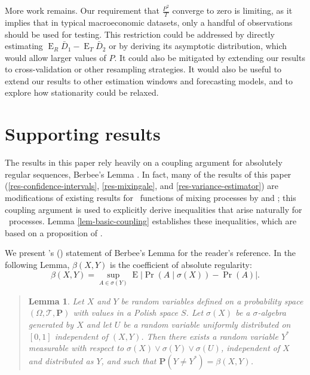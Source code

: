 \documentclass[11pt]{article}
\newtheorem{lem}[thm]{Lemma}
\DeclareMathOperator{\E}{E}
\begin{document}
More work remains.  Our requirement that $\frac{P^2}{T}$ converge to
zero is limiting, as it implies that in typical macroeconomic
datasets, only a handful of observations should be used for testing.
This restriction could be addressed by directly estimating $\E_R \bar
D_1 - \E_T \bar{D}_2$ or by deriving its asymptotic distribution,
which would allow larger values of $P$.  It could also be mitigated by
extending our results to cross-validation or other resampling
strategies.  It would also be useful to extend our results to other
estimation windows and forecasting models, and to explore how
stationarity could be relaxed.

\appendix
\section{Supporting results}
The results in this paper rely heavily on a coupling argument for
absolutely regular sequences, Berbee's Lemma
\citep{berbee_random_1979}.  In fact, many of the results of this
paper (\ref{res-confidence-intervals}, \ref{res-mixingale}, and
\ref{res-variance-estimator}) are modifications of existing
results for \ned\ functions of mixing processes by
\citet{de_jong_central_1997} and \citet{de_jong_consistency_2000};
this coupling argument is used to explicitly derive inequalities that
arise naturally for \ned\ processes.  Lemma \ref{lem-basic-coupling}
establishes these inequalities, which are based on a proposition of
\citet{merlevede_coupling_2002}.

We present \citeauthor{merlevede_coupling_2002}'s
(\citeyear{merlevede_coupling_2002}) statement of Berbee's Lemma for
the reader's reference.  In the following Lemma, $\beta(X,Y)$ is the
coefficient of absolute regularity:
\[
\beta(X,Y) = \sup_{A \in \sigma(Y)} \E \lvert \Pr(A \mid \sigma(X))
  - \Pr(A) \rvert.
\]
\begin{quotation}
\begin{lem}\label{lem-berbee}
  Let $X$ and $Y$ be random variables defined on a probability space
  $(\Omega, \mathcal{T}, \mathbf{P})$ with values in a Polish space
  $S$.  Let $\sigma(X)$ be a $\sigma$-algebra generated by $X$ and let
  $U$ be a random variable uniformly distributed on $[0,1]$
  independent of $(X,Y)$.  Then there exists a random variable $Y^{*}$
  measurable with respect to $\sigma(X) \vee \sigma(Y) \vee
  \sigma(U)$, independent of $X$ and distributed as $Y$, and such that
  $\mathbf{P}(Y \neq Y^{*}) = \beta(X,Y)$.
\end{lem}
\noindent\citep{merlevede_coupling_2002}
\end{quotation}
\end{document}
